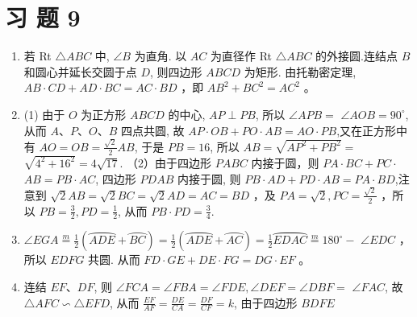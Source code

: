 \documentclass[10pt]{article}
\begin{document}
\section*{习 题 9}
\begin{enumerate}
  \item 若 Rt $\triangle A B C$ 中, $\angle B$ 为直角. 以 $A C$ 为直径作 Rt $\triangle A B C$ 的外接圆.连结点 $B$ 和圆心并延长交圆于点 $D$, 则四边形 $A B C D$ 为矩形. 由托勒密定理, $A B \cdot C D+A D \cdot B C=A C \cdot B D$ ，即 $A B^{2}+B C^{2}=A C^{2}$ 。
  \item (1) 由于 $O$ 为正方形 $A B C D$ 的中心, $A P \perp P B$, 所以 $\angle A P B=$ $\angle A O B=90^{\circ}$, 从而 $A 、 P 、 O 、 B$ 四点共圆, 故 $A P \cdot O B+P O \cdot A B=A O \cdot P B$,又在正方形中有 $A O=O B=\frac{\sqrt{2}}{2} A B$, 于是 $P B=16$, 所以 $A B=\sqrt{A P^{2}+P B^{2}}=$ $\sqrt{4^{2}+16^{2}}=4 \sqrt{17}$. （2）由于四边形 $P A B C$ 内接于圆，则 $P A \cdot B C+P C \cdot$ $A B=P B \cdot A C$, 四边形 $P D A B$ 内接于圆, 则 $P B \cdot A D+P D \cdot A B=P A \cdot B D$,注意到 $\sqrt{2} A B=\sqrt{2} B C=\sqrt{2} A D=A C=B D$ ，及 $P A=\sqrt{2}, P C=\frac{\sqrt{2}}{2}$ ，所以 $P B=\frac{3}{2}, P D=\frac{1}{2}$, 从而 $P B \cdot P D=\frac{3}{4}$.
  \item $\angle E G A \stackrel{m}{=} \frac{1}{2}(\overparen{A D E}+\overparen{B C})=\frac{1}{2}(\overparen{A D E}+\overparen{A C})=\frac{1}{2} \overparen{E D A C} \stackrel{m}{=} 180^{\circ}-$ $\angle E D C$ ，所以 $E D F G$ 共圆. 从而 $F D \cdot G E+D E \cdot F G=D G \cdot E F$ 。
  \item 连结 $E F 、 D F$, 则 $\angle F C A=\angle F B A=\angle F D E, \angle D E F=\angle D B F=$ $\angle F A C$, 故 $\triangle A F C \backsim \triangle E F D$, 从而 $\frac{E F}{A F}=\frac{D E}{C A}=\frac{D F}{C F}=k$, 由于四边形 $B D F E$
\end{enumerate}
\end{document}
